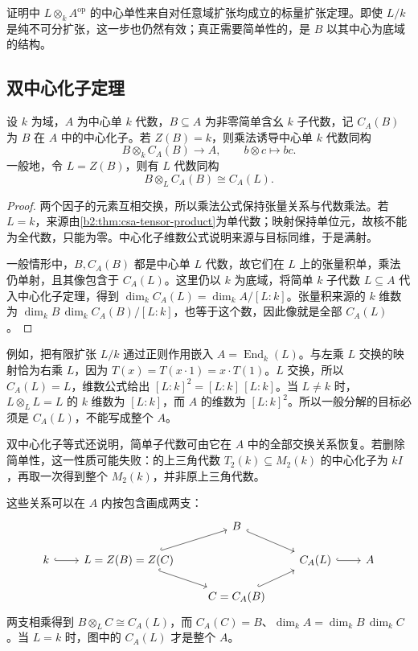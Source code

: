 证明中 \(L\otimes_kA^{\mathrm{op}}\) 的中心单性来自对任意域扩张均成立的标量扩张定理。即使 \(L/k\) 是纯不可分扩张，这一步也仍然有效；真正需要简单性的，是 \(B\) 以其中心为底域的结构。

\subsection{双中心化子定理}
\label{b2:subsec:1702:02}

\begin{corollary}\label{b2:cor:csa-centralizer-factorization}
	设 \(k\) 为域，\(A\) 为中心单 \(k\) 代数，\(B\subseteq A\) 为非零简单含幺 \(k\) 子代数，记 \(C_A(B)\) 为 \(B\) 在 \(A\) 中的中心化子。若 \(Z(B)=k\)，则乘法诱导中心单 \(k\) 代数同构
	\[
		B\otimes_kC_A(B)\longrightarrow A,\qquad b\otimes c\longmapsto bc.
	\]
	一般地，令 \(L=Z(B)\)，则有 \(L\) 代数同构
	\[
		B\otimes_LC_A(B)\cong C_A(L).
	\]
\end{corollary}
\begin{proof}
	两个因子的元素互相交换，所以乘法公式保持张量关系与代数乘法。若 \(L=k\)，来源由\cref{b2:thm:csa-tensor-product}为单代数；映射保持单位元，故核不能为全代数，只能为零。中心化子维数公式说明来源与目标同维，于是满射。

	一般情形中，\(B,C_A(B)\) 都是中心单 \(L\) 代数，故它们在 \(L\) 上的张量积单，乘法仍单射，且其像包含于 \(C_A(L)\)。这里仍以 \(k\) 为底域，将简单 \(k\) 子代数 \(L\subseteq A\) 代入中心化子定理，得到 \(\dim_k C_A(L)=\dim_kA/[L:k]\)。张量积来源的 \(k\) 维数为 \(\dim_kB\,\dim_kC_A(B)/[L:k]\)，也等于这个数，因此像就是全部 \(C_A(L)\)。
\end{proof}

例如，把有限扩张 \(L/k\) 通过正则作用嵌入 \(A=\operatorname{End}_k(L)\)。与左乘 \(L\) 交换的映射恰为右乘 \(L\)，因为 \(T(x)=T(x\cdot1)=x\cdot T(1)\)。\(L\) 交换，所以 \(C_A(L)=L\)，维数公式给出 \([L:k]^2=[L:k]\,[L:k]\)。当 \(L\ne k\) 时，\(L\otimes_L L=L\) 的 \(k\) 维数为 \([L:k]\)，而 \(A\) 的维数为 \([L:k]^2\)。所以一般分解的目标必须是 \(C_A(L)\)，不能写成整个 \(A\)。

\ProseParagraphBreak
双中心化子等式还说明，简单子代数可由它在 \(A\) 中的全部交换关系恢复。若删除简单性，这一性质可能失败：的上三角代数 \(T_2(k)\subseteq M_2(k)\) 的中心化子为 \(kI\)，再取一次得到整个 \(M_2(k)\)，并非原上三角代数。

这些关系可以在 \(A\) 内按包含画成两支：
\[
	\begin{tikzcd}[column sep=2.2em,row sep=1.5em]
		& & B \arrow[dr,hook] & & \\
		k \arrow[r,hook] & L=Z(B)=Z(C) \arrow[ur,hook] \arrow[dr,hook] & & C_A(L) \arrow[r,hook] & A\\
		& & C=C_A(B) \arrow[ur,hook] & &
	\end{tikzcd}
\]
两支相乘得到 \(B\otimes_LC\cong C_A(L)\)，而 \(C_A(C)=B\)、\(\dim_kA=\dim_kB\,\dim_kC\)。当 \(L=k\) 时，图中的 \(C_A(L)\) 才是整个 \(A\)。

